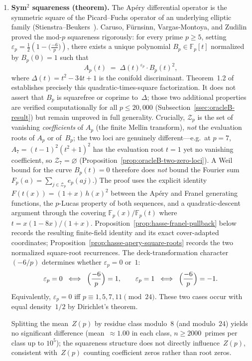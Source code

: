 \documentclass[11pt]{article}
\theoremstyle{definition}
\theoremstyle{remark}
\begin{document}
\begin{enumerate}
\item \textbf{Sym$^2$ squareness
(theorem).}\label{rem:squareness}
The Ap\'ery differential operator is the symmetric
square of the Picard--Fuchs operator of an
underlying elliptic family (Stienstra--Beukers~\cite{SB1985}).
Caruso, F\"urnsinn, Vargas-Montoya, and
Zudilin~\cite{CFVZ2026} proved the mod-$p$
squareness rigorously: for every prime $p \ge 5$,
setting $\varepsilon_p = \frac{1}{2}(1 - \bigl(\frac{-6}{p}\bigr))$,
there exists a unique polynomial $B_p \in \mathbb{F}_p[t]$ normalized by
$B_p(0)=1$ such that
\[
  A_p(t) \;=\; \Delta(t)^{\varepsilon_p}\cdot B_p(t)^2,
\]
where $\Delta(t) = t^2 - 34t + 1$ is the
conifold discriminant.  Theorem~1.2
of~\cite{CFVZ2026} establishes precisely this
quadratic-times-square factorization.  It does not assert
that $B_p$ is squarefree or coprime to~$\Delta$;
those two additional properties are verified computationally
for all $p \le 20{,}000$
(Subsection~\ref{ssec:oracleB-result}) but remain unproved
in full generality.
Crucially, $\mathcal{Z}_p$ is the set of vanishing
\emph{coefficients} of $A_p$
(the finite Mellin transform), \emph{not} the
evaluation roots of $A_p$ or of~$B_p$; the two loci
are genuinely different---e.g.\ at $p = 7$,
$A_7 = (t{-}1)^2(t^2{+}1)^2$ has the evaluation root
$t = 1$ yet no vanishing coefficient, so
$\mathcal{Z}_7 = \varnothing$
(Proposition~\ref{prop:oracleB-two-zero-loci}).
A Weil bound for the curve $B_p(t) = 0$ therefore
does \emph{not} bound the Fourier sum
$F_p(a) = \sum_{j \in \mathcal{Z}_p} e_p(aj)$.)
The proof uses the explicit identity
$F(t(x)) = (1+x)\,h(x)^2$ between the Ap\'ery
and Franel generating functions, the $p$-Lucas
property of both sequences, and a quadratic-descent
argument through the covering
$\mathbb{F}_p(x)/\mathbb{F}_p(t)$ where
$t = x(1-8x)/(1+x)$.
Proposition~\ref{prop:hasse-franel-pullback} below records the resulting
finite-field identity and its exact cover-adapted coordinates;
Proposition~\ref{prop:hasse-apery-square-roots} records the two normalized
square-root recurrences.
The deck-transformation character $(-6/p)$ determines
whether $\varepsilon_p = 0$ or~$1$:
\[
  \varepsilon_p = 0 \;\iff\;
  \Bigl(\frac{-6}{p}\Bigr) = 1,
  \qquad
  \varepsilon_p = 1 \;\iff\;
  \Bigl(\frac{-6}{p}\Bigr) = -1.
\]
Equivalently, $\varepsilon_p = 0$ iff
$p \equiv 1, 5, 7, 11 \pmod{24}$.
These two cases occur with equal density~$1/2$
by Dirichlet's theorem.

Splitting the mean~$Z(p)$ by residue
class modulo~$8$ (and modulo~$24$)
yields no significant difference
(mean~$\approx 1.00$ in each class,
$n \ge 2000$~primes per class up to $10^5$);
the squareness structure does not
directly influence~$Z(p)$,
consistent with~$Z(p)$ counting coefficient
zeros rather than root zeros.


\end{enumerate}
\end{document}
